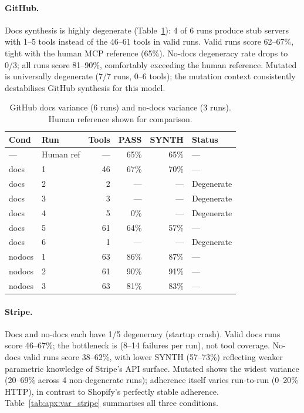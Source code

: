 \paragraph{GitHub.}
Docs synthesis is highly degenerate (Table~\ref{tab:apx:var_github}): 4 of 6 runs produce stub servers with 1--5 tools instead of the 46--61 tools in valid runs. Valid runs score 62--67\%, tight with the human MCP reference (65\%). No-docs degeneracy rate drops to 0/3; all runs score 81--90\%, comfortably exceeding the human reference. Mutated is universally degenerate (7/7 runs, 0--6 tools); the mutation context consistently destabilises GitHub synthesis for this model.

\begin{table}[htbp]
  \centering
  \caption{GitHub docs variance (6 runs) and no-docs variance (3 runs). Human reference shown for comparison.}
  \label{tab:apx:var_github}
  \small
  \begin{tabular}{llrrrl}
    \toprule
    Cond & Run & Tools & PASS & SYNTH & Status \\
    \midrule
    — & Human ref & — & 65\% & 65\% & — \\
    \midrule
    docs & 1 & 46 & 67\% & 70\% & — \\
    docs & 2 & 2 & --- & --- & Degenerate \\
    docs & 3 & 3 & --- & --- & Degenerate \\
    docs & 4 & 5 & 0\% & --- & Degenerate \\
    docs & 5 & 61 & 64\% & 57\% & — \\
    docs & 6 & 1 & --- & --- & Degenerate \\
    \midrule
    nodocs & 1 & 63 & 86\% & 87\% & — \\
    nodocs & 2 & 61 & 90\% & 91\% & — \\
    nodocs & 3 & 63 & 81\% & 83\% & — \\
    \bottomrule
  \end{tabular}
\end{table}

\paragraph{Stripe.}
Docs and no-docs each have 1/5 degeneracy (startup crash). Valid docs runs score 46--67\%; the bottleneck is  (8--14 failures per run), not tool coverage. No-docs valid runs score 38--62\%, with lower SYNTH (57--73\%) reflecting weaker parametric knowledge of Stripe's API surface. Mutated shows the widest variance (20--69\% across 4 non-degenerate runs); adherence itself varies run-to-run (0--20\% HTTP), in contrast to Shopify's perfectly stable adherence. Table~\ref{tab:apx:var_stripe} summarises all three conditions.

